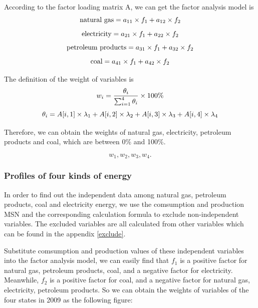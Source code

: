 \documentclass[a4paper,11pt]{article}
\begin{document}
\par According to the factor loading matrix A, we can get the factor analysis model is
\begin{equation}
    \centering
    \text{natural gas}=a_{11} \times f_1+a_{12} \times f_2
\end{equation}
\begin{equation}
    \centering
    \text{electricity}=a_{21} \times f_1+a_{22} \times f_2
\end{equation}
\begin{equation}
    \centering
    \text{petroleum products}=a_{31} \times f_1+a_{32} \times f_2
\end{equation}
\begin{equation}
    \centering
    \text{coal}=a_{41} \times f_1+a_{42} \times f_2
\end{equation}
\par The definition of the weight of variables is\cite{5}
\begin{equation}
    \centering
w_i=\frac{ \theta_i }{ \sum_{i=1}^{4}\theta_i } \times 100\%
\end{equation}
\begin{equation}
    \centering
\theta_i=A[i,1] \times \lambda_1+A[i,2] \times \lambda_2+A[i,3] \times \lambda_3+A[i,4] \times \lambda_4
\end{equation}

\par Therefore, we can obtain the weights of natural gas, electricity, petroleum products and coal, which are between 0\% and 100\%.

\[
w_1, w_2, w_3, w_4.
\]


\subsubsection{Profiles of four kinds of energy}

\par In order to find out the independent data among natural gas, petroleum products, coal and electricity energy, we use the comsumption and production MSN and the corresponding calculation formula \cite{4} to exclude non-independent variables. The excluded variables are all calculated from other variables which can be found in the appendix \ref{exclude}.

\par Substitute comsumption and production values of these independent variables into the factor analysis model, we can easily find that $f_1$ is a positive factor for natural gas, petroleum products, coal, and a negative factor for electricity. Meanwhile, $f_2$ is a positive factor for coal, and a negative factor for natural gas, electricity, petroleum products. So we can obtain the weights of variables of the four states in 2009 as the following figure:
\end{document}
